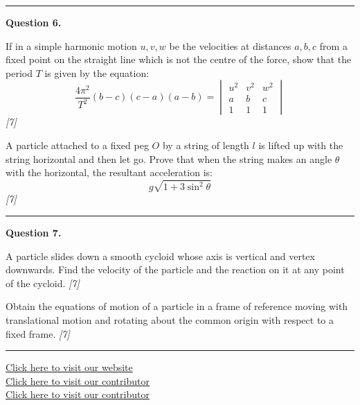 \documentclass[11pt,a4paper]{article}
\newcommand{\pts}[1]{\hfill   \textit{[#1]}}
\begin{document}
\medskip\rule{\linewidth}{0.2pt}

\medskip


\noindent   \textbf{Question 6.}

\begin{parts}
  \item If in a simple harmonic motion $u, v, w$ be the velocities at distances $a, b, c$ from a fixed point on the straight line which is not the centre of the force, show that the period $T$ is given by the equation:
  \[
  \frac{4\pi^2}{T^2}(b-c)(c-a)(a-b) = 
\begin{vmatrix} u^2 & v^2 & w^2 \\ a & b & c \\ 1 & 1 & 1 \end{vmatrix}
  \] \pts{7}
  \item A particle attached to a fixed peg $O$ by a string of length $l$ is lifted up with the string horizontal and then let go. Prove that when the string makes an angle $ \theta$ with the horizontal, the resultant acceleration is:
  \[
  g \sqrt{1 + 3\sin^2 \theta}
  \] \pts{7}
\end{parts}

\medskip\rule{\linewidth}{0.2pt}

\medskip


\noindent   \textbf{Question 7.}

\begin{parts}
  \item A particle slides down a smooth cycloid whose axis is vertical and vertex downwards. Find the velocity of the particle and the reaction on it at any point of the cycloid. \pts{7}
  \item Obtain the equations of motion of a particle in a frame of reference moving with translational motion and rotating about the common origin with respect to a fixed frame. \pts{7}
\end{parts}

\vfill
\rule{\linewidth}{0.4pt}

\begin{center}\small
  \href{https://bhu-exam.vercel.app/}{Click here to visit our website}\\[4pt]
  \href{https://me-aryan.vercel.app/}{Click here to visit our contributor}\\[4pt]
  \href{https://quashan-me.vercel.app/}{Click here to visit our contributor}
\end{center}
\end{document}
